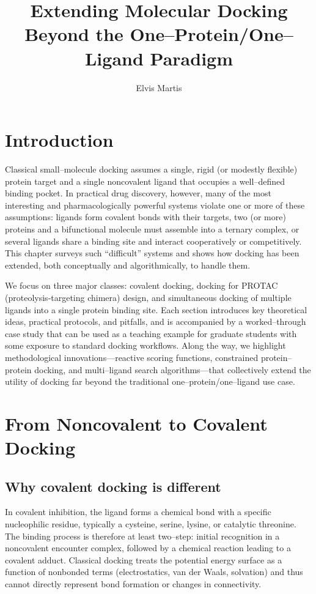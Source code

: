 \documentclass[12pt]{article}
\begin{document}
\title{Extending Molecular Docking Beyond the One–Protein/One–Ligand Paradigm}
\author{Elvis Martis}
\date{}
\maketitle

\section{Introduction}

Classical small–molecule docking assumes a single, rigid (or modestly flexible) protein target and a single noncovalent ligand that occupies a well–defined binding pocket.  
In practical drug discovery, however, many of the most interesting and pharmacologically powerful systems violate one or more of these assumptions: ligands form covalent bonds with their targets, two (or more) proteins and a bifunctional molecule must assemble into a ternary complex, or several ligands share a binding site and interact cooperatively or competitively.  
This chapter surveys such “difficult” systems and shows how docking has been extended, both conceptually and algorithmically, to handle them.

We focus on three major classes: covalent docking, docking for PROTAC (proteolysis‐targeting chimera) design, and simultaneous docking of multiple ligands into a single protein binding site.  
Each section introduces key theoretical ideas, practical protocols, and pitfalls, and is accompanied by a worked–through case study that can be used as a teaching example for graduate students with some exposure to standard docking workflows.  
Along the way, we highlight methodological innovations—reactive scoring functions, constrained protein–protein docking, and multi–ligand search algorithms—that collectively extend the utility of docking far beyond the traditional one–protein/one–ligand use case.

\section{From Noncovalent to Covalent Docking}

\subsection{Why covalent docking is different}

In covalent inhibition, the ligand forms a chemical bond with a specific nucleophilic residue, typically a cysteine, serine, lysine, or catalytic threonine.  
The binding process is therefore at least two–step: initial recognition in a noncovalent encounter complex, followed by a chemical reaction leading to a covalent adduct.  
Classical docking treats the potential energy surface as a function of nonbonded terms (electrostatics, van der Waals, solvation) and thus cannot directly represent bond formation or changes in connectivity.
\end{document}
